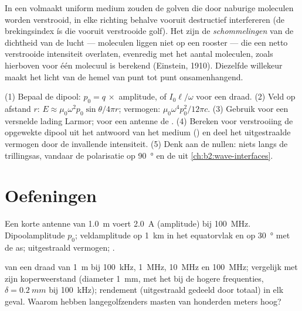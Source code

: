 \begin{remark}\label{rem:b2:dipole-radiation:why}
In een volmaakt uniform medium zouden de golven die door naburige moleculen
worden verstrooid, in elke richting behalve vooruit destructief interfereren
(de brekingsindex ís die vooruit verstrooide golf). Het zijn de
\emph{schommelingen} van de dichtheid van de lucht --- moleculen liggen niet
op een rooster --- die een netto verstrooide intensiteit overlaten,
evenredig met het aantal moleculen, zoals hierboven voor één molecuul is
berekend (Einstein, 1910). Diezelfde willekeur maakt het licht van de hemel
van punt tot punt onsamenhangend.
\end{remark}

\begin{method}[Stralingsschattingen]\label{met:b2:dipole-radiation:method}
(1) Bepaal de dipool: $p_0 = q\,\times$ amplitude, of $I_0\ell/\omega$ voor
een draad. (2) Veld op afstand $r$:
$E \approx \mu_0\omega^2p_0\sin\theta/4\pi r$; vermogen:
$\mu_0\omega^4p_0^2/12\pi c$. (3) Gebruik voor een versnelde lading Larmor;
voor een antenne de . (4) Bereken voor verstrooiing de
opgewekte dipool uit het antwoord van het medium () en deel
het uitgestraalde vermogen door de invallende intensiteit. (5) Denk aan de
nullen: niets langs de trillingsas, vandaar de polarisatie op
\qty{90}{\degree} en de  uit \cref{ch:b2:wave-interfaces}.
\end{method}

\section{Oefeningen}

\begin{exercise}[$\star$]\label{exo:b2:dipole-radiation:1}
Een korte antenne van \qty{1.0}{m} voert \qty{2.0}{A} (amplitude) bij
\qty{100}{MHz}. Dipoolamplitude $p_0$; veldamplitude op \qty{1}{km} in het
equatorvlak en op \qty{30}{\degree} met de as; uitgestraald vermogen;
.
\end{exercise}

\begin{exercise}[$\star$]\label{exo:b2:dipole-radiation:2}
 van een draad van \qty{1}{m} bij \qty{100}{kHz},
\qty{1}{MHz}, \qty{10}{MHz} en \qty{100}{MHz}; vergelijk met zijn
koperweerstand (diameter \qty{1}{mm}, met het  bij de hogere
frequenties, $\delta = \qty{0.2}{mm}$ bij \qty{100}{kHz}); rendement
(uitgestraald gedeeld door totaal) in elk geval. Waarom hebben
langegolfzenders masten van honderden meters hoog?
\end{exercise}

